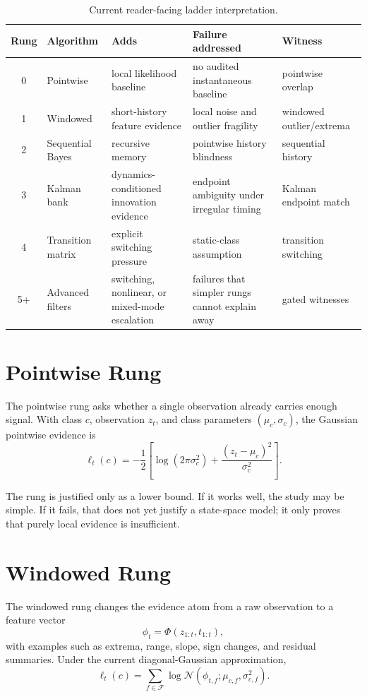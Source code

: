 \documentclass[11pt]{article}
\begin{document}
\begin{table}[htbp]
\centering
\caption{Current reader-facing ladder interpretation.}
\label{tab:ladder_story}
\begin{tabularx}{\textwidth}{@{}c l X X l@{}}
\toprule
Rung & Algorithm & Adds & Failure addressed & Witness \\
\midrule
0 & Pointwise & local likelihood baseline & no audited instantaneous baseline & pointwise overlap \\
1 & Windowed & short-history feature evidence & local noise and outlier fragility & windowed outlier/extrema \\
2 & Sequential Bayes & recursive memory & pointwise history blindness & sequential history \\
3 & Kalman bank & dynamics-conditioned innovation evidence & endpoint ambiguity under irregular timing & Kalman endpoint match \\
4 & Transition matrix & explicit switching pressure & static-class assumption & transition switching \\
5+ & Advanced filters & switching, nonlinear, or mixed-mode escalation & failures that simpler rungs cannot explain away & gated witnesses \\
\bottomrule
\end{tabularx}
\end{table}

\section{Pointwise Rung}
The pointwise rung asks whether a single observation already carries enough signal. With class \(c\), observation \(z_t\), and class parameters \((\mu_c, \sigma_c)\), the Gaussian pointwise evidence is
\begin{equation}
\ell_t(c)
=
-\frac{1}{2}
\left[
\log(2\pi \sigma_c^2)
+
\frac{(z_t - \mu_c)^2}{\sigma_c^2}
\right].
\end{equation}

The rung is justified only as a lower bound. If it works well, the study may be simple. If it fails, that does not yet justify a state-space model; it only proves that purely local evidence is insufficient.

\section{Windowed Rung}
The windowed rung changes the evidence atom from a raw observation to a feature vector
\begin{equation}
\phi_t = \Phi(z_{1:t}, t_{1:t}),
\end{equation}
with examples such as extrema, range, slope, sign changes, and residual summaries. Under the current diagonal-Gaussian approximation,
\begin{equation}
\ell_t(c)
=
\sum_{f \in \mathcal{F}}
\log \mathcal{N}\!\left(\phi_{t,f}; \mu_{c,f}, \sigma_{c,f}^2\right).
\end{equation}
\end{document}

